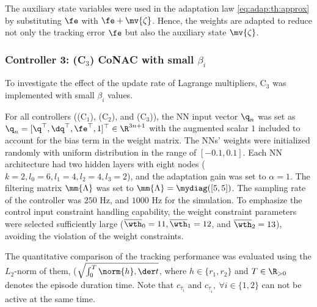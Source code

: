\documentclass[final,5p,times,twocolumn,authoryear]{elsarticle}
\begin{document}
The auxiliary state variables were used in the adaptation law \eqref{eq:adap:th:approx} by substituting $\fe$ with $\fe+\mv{\zeta}$.
Hence, the weights are adapted to reduce not only the tracking error $\fe$ but also the auxiliary state $\mv{\zeta}$.

\subsubsection*{Controller 3: (C$_3$) CoNAC with small $\beta_i$}

To investigate the effect of the update rate of Lagrange multipliers, C$_3$ was implemented with small $\beta_i$ values.

\hfill

For all controllers ((C$_1$), (C$_2$), and (C$_3$)), the NN input vector ${\q}_n$ was set as ${\q}_n=[\q^\top,\dq^\top,\fe^\top,1]^\top\in\R^{3n+1}$ with the augmented scalar $1$ included to account for the bias term in the weight matrix. 
The NNs' weights were initialized randomly with uniform distribution in the range of $[-0.1,0.1]$.
Each NN architecture had two hidden layers with eight nodes (\ie $k=2, l_0=6, l_1=4, l_2=4, l_3=2$), and the adaptation gain was set to $\alpha=1$.
The filtering matrix $\mm{\Lambda}$ was set to $\mm{\Lambda}=\mydiag([5,5])$.
The sampling rate of the controller was $250$ Hz, and $1000$ Hz for the simulation.
To emphasize the control input constraint handling capability, the weight constraint parameters were selected sufficiently large (\ie $\overline\wth_0=11, \overline\wth_1=12$, and $\overline\wth_2=13$), avoiding the violation of the weight constraints. 

The quantitative comparison of the tracking performance was evaluated using the $L_2$-norm of them, (\ie $\sqrt{\int_0^T\norm{h},\der t}$, where $h\in\{r_1,r_2\}$ and $T\in\R_{>0}$ denotes the episode duration time.
Note that $c_{\overline\tau_i}$ and $c_{\underline\tau_i},\ \forall i\in\{1,2\}$ can not be active at the same time.
\end{document}
